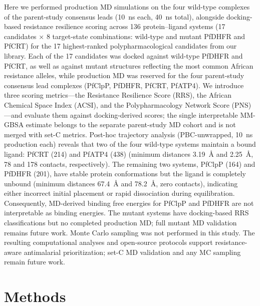\documentclass[11pt,a4paper]{article}
\begin{document}
Here we performed production MD simulations on the four wild-type complexes of the parent-study consensus leads (\SI{10}{\nano\second} each, \SI{40}{\nano\second} total), alongside docking-based resistance resilience scoring across 136 protein--ligand systems (17 candidates $\times$ 8 target-state combinations: wild-type and mutant PfDHFR and PfCRT) for the 17 highest-ranked polypharmacological candidates from our library. Each of the 17 candidates was docked against wild-type PfDHFR and PfCRT, as well as against mutant structures reflecting the most common African resistance alleles, while production MD was reserved for the four parent-study consensus lead complexes (PfClpP, PfDHFR, PfCRT, PfATP4). We introduce three scoring metrics---the Resistance Resilience Score (RRS), the African Chemical Space Index (ACSI), and the Polypharmacology Network Score (PNS)---and evaluate them against docking-derived scores; the single interpretable MM-GBSA estimate belongs to the separate parent-study MD cohort and is not merged with set-C metrics. Post-hoc trajectory analysis (PBC-unwrapped, \SI{10}{\nano\second} production each) reveals that two of the four wild-type systems maintain a bound ligand: PfCRT (214) and PfATP4 (438) (minimum distances \SI{3.19}{\angstrom} and \SI{2.25}{\angstrom}, \num{78} and \num{178} contacts, respectively). The remaining two systems, PfClpP (164) and PfDHFR (201), have stable protein conformations but the ligand is completely unbound (minimum distances \SI{67.4}{\angstrom} and \SI{78.2}{\angstrom}, zero contacts), indicating either incorrect initial placement or rapid dissociation during equilibration. Consequently, MD-derived binding free energies for PfClpP and PfDHFR are not interpretable as binding energies. The mutant systems have docking-based RRS classifications but no completed production MD; full mutant MD validation remains future work. Monte Carlo sampling was not performed in this study. The resulting computational analyses and open-source protocols support resistance-aware antimalarial prioritization; set-C MD validation and any MC sampling remain future work.


\section{Methods}
\end{document}

